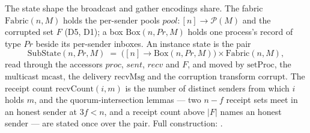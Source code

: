 \begin{definition}
  \label{def:aba-fabric}
  \leanok
  The state shape the broadcast and gather encodings share.
  The fabric $\mathrm{Fabric}(n, M)$ holds the per-sender pools $pool : [n] \to \mathcal{P}(M)$ and the corrupted set $F$ (D5, D1); a box $\mathrm{Box}(n, Pr, M)$ holds one process's record of type $Pr$ beside its per-sender inboxes.
  An instance state is the pair
  \[
    \mathrm{SubState}(n, Pr, M) \;=\; \bigl([n] \to \mathrm{Box}(n, Pr, M)\bigr) \times \mathrm{Fabric}(n, M),
  \]
  read through the accessors $\mathit{proc}$, $\mathit{sent}$, $\mathit{recv}$ and $F$, and moved by $\mathrm{setProc}$, the multicast $\mathrm{mcast}$, the delivery $\mathrm{recvMsg}$ and the corruption transform $\mathrm{corrupt}$.
  The receipt count $\mathrm{recvCount}(i, m)$ is the number of distinct senders from which $i$ holds $m$, and the quorum-intersection lemmas --- two $n{-}f$ receipt sets meet in an honest sender at $3f < n$, and a receipt count above $|F|$ names an honest sender --- are stated once over the pair.
  Full construction: .
\end{definition}
